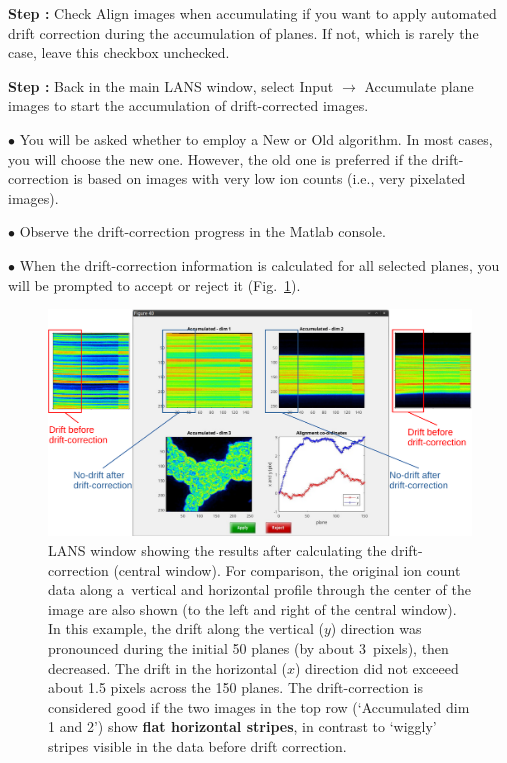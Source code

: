 \documentclass[a4paper, 11pt]{article}
\newcommand{\lans}[1]{{\color{magenta}#1}}
\newcommand{\lanscb}[1]{{\color{darkgreen}#1}}
\newcommand\ra{\rightarrow}
\newcounter{step}
\newcommand\s{\addtocounter{step}{1}\vskip5pt\noindent\textbf{Step \thestep:}{ }}
\newcommand\bul{\vskip5pt\noindent$\bullet${ }}
\newcommand\bb[1]{\textbf{#1}}
\begin{document}
\s Check \lanscb{Align images when accumulating} if you want to apply automated drift correction during the accumulation of planes. If not, which is rarely the case, leave this checkbox unchecked.

\s Back in the main LANS window, select \lans{Input} $\ra$ \lans{Accumulate plane images} to start the accumulation of drift-corrected images. 

\bul You will be asked whether to employ a \lans{New} or \lans{Old} algorithm. In most cases, you will choose the new one. However, the old one is preferred if the drift-correction is based on images with very low ion counts (i.e., very pixelated images).

\bul Observe the drift-correction progress in the Matlab console. 

\bul When the drift-correction information is calculated for all selected planes, you will be prompted to accept or reject it (Fig.~\ref{fig:drift-correction}). 

\begin{figure}[!ht]
\centering
\includegraphics[width=\textwidth]{figs3/LANS-drift-correction}
\caption{\label{fig:drift-correction}%
LANS window showing the results after calculating the drift-correction (central window). For comparison, the original ion count data along a~vertical and horizontal profile through the center of the image are also shown (to the left and right of the central window). In this example, the drift along the vertical ($y$) direction was pronounced during the initial 50 planes (by about 3~pixels), then decreased. The drift in the horizontal ($x$) direction did not exceeed about 1.5 pixels across the 150 planes. The drift-correction is considered good if the two images in the top row (`Accumulated dim 1 and 2') show \bb{flat horizontal stripes}, in contrast to `wiggly' stripes visible in the data before drift correction.}
\end{figure}
\end{document}
